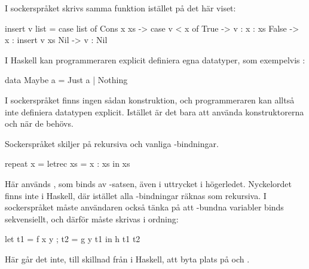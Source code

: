 \documentclass[Rapport]{subfiles}
\begin{document}
I sockerspråket skrivs samma funktion istället på det här viset:

\begin{codeEx}
  insert v list = case list of
      Cons x xs -> case v < x of
          True  -> v : x : xs
          False -> x : insert v xs
      Nil -> v : Nil
\end{codeEx}

I Haskell kan programmeraren explicit definiera egna datatyper, som exempelvis :
    
\begin{codeEx}
data Maybe a = Just a | Nothing
\end{codeEx}

I sockerspråket finns ingen sådan konstruktion, och programmeraren kan alltså inte
definiera datatypen explicit. Istället är det bara att använda
konstruktorerna  och  när de behövs.


Sockerspråket skiljer på rekursiva och vanliga -bindningar. 

\begin{codeEx}
repeat x = letrec xs = x : xs in xs  
\end{codeEx}

Här används , som binds av -satsen, även i uttrycket i högerledet.
Nyckelordet  finns inte i Haskell, där istället alla -bindningar räknas som rekursiva. I
sockerspråket måste användaren också tänka på att -bundna variabler binds
sekvensiellt, och därför måste skrivas i ordning:

\begin{codeEx}
let { t1 = f x y
    ; t2 = g y t1
    }
in  h t1 t2
\end{codeEx}

Här går det inte, till skillnad från i Haskell, att byta plats på  och .
\end{document}
